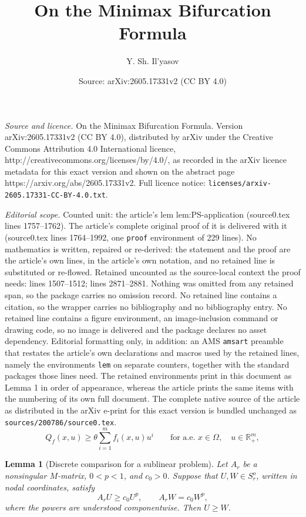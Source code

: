 \documentclass[10pt,a4paper]{amsart}
\title{On the Minimax Bifurcation Formula}
\author{Y. Sh. Il'yasov}
\date{Source: arXiv:2605.17331v2 (CC BY 4.0)}
\newtheorem{lem}{Lemma}
\begin{document}
\maketitle

\noindent\emph{Source and licence.} On the Minimax Bifurcation Formula. Version arXiv:2605.17331v2 (CC BY 4.0), distributed by arXiv under the Creative Commons Attribution 4.0 International licence, http://creativecommons.org/licenses/by/4.0/, as recorded in the arXiv licence metadata for this exact version and shown on the abstract page https://arxiv.org/abs/2605.17331v2. Full licence notice: \texttt{licenses/arxiv-2605.17331-CC-BY-4.0.txt}.\par\smallskip

\noindent\textit{Editorial scope.} Counted unit: the article's lem lem:PS-application (source0.tex lines 1757--1762). The article's complete original proof of it is delivered with it (source0.tex lines 1764--1992, one \texttt{proof} environment of 229 lines). No mathematics is written, repaired or re-derived: the statement and the proof are the article's own lines, in the article's own notation, and no retained line is substituted or re-flowed.  Retained uncounted as the source-local context the proof needs: lines 1507--1512; lines 2871--2881.  Nothing was omitted from any retained span, so the package carries no omission record.  No retained line contains a citation, so the wrapper carries no bibliography and no bibliography entry.  No retained line contains a figure environment, an image-inclusion command or drawing code, so no image is delivered and the package declares no asset dependency.  Editorial formatting only, in addition: an AMS \texttt{amsart} preamble that restates the article's own declarations and macros used by the retained lines, namely the environments \texttt{lem} on separate counters, together with the standard packages those lines need.  The retained environments print in this document as Lemma 1 in order of appearance, whereas the article prints the same items with the numbering of its own full document.  The complete native source of the article as distributed in the arXiv e-print for this exact version is bundled unchanged as \texttt{sources/200786/source0.tex}.
\begin{equation}
	\label{eq:picone-superlinearity-f}
	Q_f(x,u)\ge \theta\sum_{i=1}^m f_i(x,u)u^i
	\qquad
	\text{for a.e. }x\in\Omega,\quad u\in\mathbb R_+^m,
\end{equation}

\begin{lem}[Discrete comparison for a sublinear problem]
	\label{lem:discrete-comparison-sublinear}
	Let \(A_r\) be a nonsingular \(M\)-matrix, \(0<p<1\), and \(c_0>0\).
	Suppose that \(U,W\in S_r^o\), written in nodal coordinates, satisfy
	\[
	A_rU\ge c_0U^p,
	\qquad
	A_rW=c_0W^p ,
	\]
	where the powers are understood componentwise. Then \(U\ge W\).
\end{lem}
\end{document}
